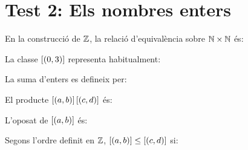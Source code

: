 
\section{Test 2: Els nombres enters}


\begin{enumerate}

\pregunta En la construcció de \(\mathbb{Z}\), la relació d'equivalència sobre \(\mathbb{N}\times\mathbb{N}\) és:
\begin{enumerate}
\end{enumerate}
\feedback

\pregunta La classe \(\left[(0,3)\right]\) representa habitualment:
\begin{enumerate}
\end{enumerate}
\feedback

\pregunta La suma d'enters es defineix per:
\begin{enumerate}
\end{enumerate}
\feedback

\pregunta El producte \(\left[(a,b)\right]\left[(c,d)\right]\) és:
\begin{enumerate}
\end{enumerate}
\feedback

\pregunta L'oposat de \(\left[(a,b)\right]\) és:
\begin{enumerate}
\end{enumerate}
\feedback

\pregunta Segons l'ordre definit en \(\mathbb{Z}\), \(\left[(a,b)\right]\leq\left[(c,d)\right]\) si:
\begin{enumerate}
\end{enumerate}
\feedback


\end{enumerate}

